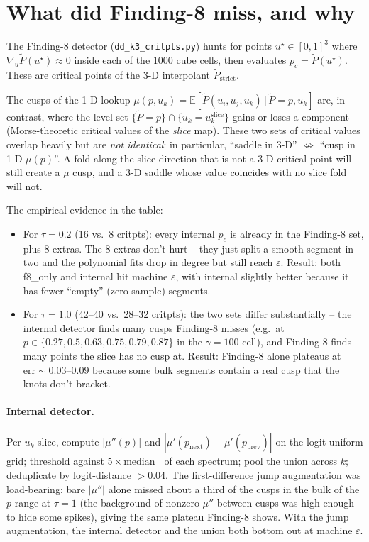 \documentclass[11pt,a4paper]{article}
\begin{document}
\section{What did Finding-8 miss, and why}\label{sec:detectors}

The Finding-8 detector (\texttt{dd\_k3\_critpts.py}) hunts for points
$u^\star\in[0,1]^3$ where $\nabla_u \tilde P(u^\star)\approx 0$ inside each
of the 1000 cube cells, then evaluates $p_c=\tilde P(u^\star)$. These are
critical points of the 3-D interpolant $\tilde P_\mathrm{strict}$.

The cusps of the 1-D lookup
$\mu(p,u_k) = \mathbb{E}[\tilde P(u_i,u_j,u_k)\,|\,\tilde P=p, u_k]$ are,
in contrast, where the level set $\{\tilde P=p\}\cap\{u_k=u_k^\mathrm{slice}\}$
gains or loses a component (Morse-theoretic critical values of the
\emph{slice} map). These two sets of critical values overlap heavily but
are \emph{not identical}: in particular, ``saddle in 3-D''
$\not\Leftrightarrow$ ``cusp in 1-D $\mu(p)$''. A fold along the slice
direction that is not a 3-D critical point will still create a $\mu$ cusp,
and a 3-D saddle whose value coincides with no slice fold will not.

The empirical evidence in the table:
\begin{itemize}
\item For $\tau{=}0.2$ (16 vs.\ 8 critpts): every internal $p_c$ is already
  in the Finding-8 set, plus 8 extras. The 8 extras don't hurt -- they
  just split a smooth segment in two and the polynomial fits drop in degree
  but still reach $\varepsilon$. Result: both f8\_only and internal hit
  machine $\varepsilon$, with internal slightly better because it has fewer
  ``empty'' (zero-sample) segments.
\item For $\tau{=}1.0$ (42--40 vs.\ 28--32 critpts): the two sets differ
  substantially -- the internal detector finds many cusps Finding-8 misses
  (e.g.\ at $p\in\{0.27, 0.5, 0.63, 0.75, 0.79, 0.87\}$ in the $\gamma{=}100$
  cell), and Finding-8 finds many points the slice has no cusp at. Result:
  Finding-8 alone plateaus at $\mathrm{err}\sim 0.03$--$0.09$ because some
  bulk segments contain a real cusp that the knots don't bracket.
\end{itemize}

\paragraph{Internal detector.} Per $u_k$ slice, compute $|\mu''(p)|$ and
$|\mu'(p_\mathrm{next})-\mu'(p_\mathrm{prev})|$ on the logit-uniform grid;
threshold against $5\times \mathrm{median}_+$ of each spectrum; pool the
union across $k$; deduplicate by logit-distance $>0.04$. The first-difference
jump augmentation was load-bearing: bare $|\mu''|$ alone missed about a
third of the cusps in the bulk of the $p$-range at $\tau{=}1$ (the
background of nonzero $\mu''$ between cusps was high enough to hide some
spikes), giving the same plateau Finding-8 shows. With the jump
augmentation, the internal detector and the union both bottom out at
machine $\varepsilon$.
\end{document}
